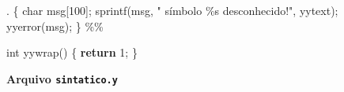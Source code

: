 \documentclass[
  brazilian,
  letterpaper,
]{book}
\newenvironment{Shaded}{\begin{snugshade}}{\end{snugshade}}
\newcommand{\ControlFlowTok}[1]{\textcolor[rgb]{0.00,0.23,0.31}{\textbf{#1}}}
\newcommand{\DataTypeTok}[1]{\textcolor[rgb]{0.68,0.00,0.00}{#1}}
\newcommand{\DecValTok}[1]{\textcolor[rgb]{0.68,0.00,0.00}{#1}}
\newcommand{\NormalTok}[1]{\textcolor[rgb]{0.00,0.23,0.31}{#1}}
\newcommand{\OperatorTok}[1]{\textcolor[rgb]{0.37,0.37,0.37}{#1}}
\newcommand{\SpecialCharTok}[1]{\textcolor[rgb]{0.37,0.37,0.37}{#1}}
\newcommand{\StringTok}[1]{\textcolor[rgb]{0.13,0.47,0.30}{#1}}
\theoremstyle{plain}
\theoremstyle{definition}
\theoremstyle{remark}
\begin{document}
\begin{Shaded}
\begin{Highlighting}[]
\OperatorTok{.}                 \OperatorTok{\{} 
                      \DataTypeTok{char}\NormalTok{ msg}\OperatorTok{[}\DecValTok{100}\OperatorTok{];}
\NormalTok{                      sprintf}\OperatorTok{(}\NormalTok{msg}\OperatorTok{,} \StringTok{"  símbolo }\SpecialCharTok{\%s}\StringTok{ desconhecido!"}\OperatorTok{,}\NormalTok{ yytext}\OperatorTok{);}
\NormalTok{                      yyerror}\OperatorTok{(}\NormalTok{msg}\OperatorTok{);} 
                  \OperatorTok{\}}
\OperatorTok{\%\%}


\DataTypeTok{int}\NormalTok{ yywrap}\OperatorTok{()} \OperatorTok{\{}
  \ControlFlowTok{return} \DecValTok{1}\OperatorTok{;}
\OperatorTok{\}}
\end{Highlighting}
\end{Shaded}

\textbf{Arquivo \texttt{sintatico.y}}
\end{document}
